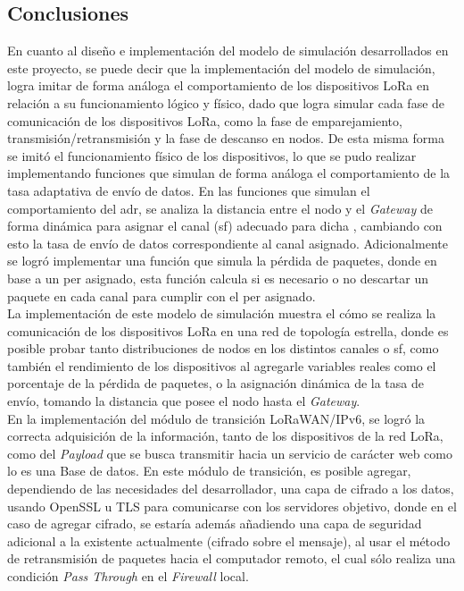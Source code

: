 \begin{justify}
\chapter{Conclusiones}
En cuanto al diseño e implementación del modelo de simulación desarrollados en este proyecto, se puede decir que la implementación del modelo de simulación, logra imitar de forma análoga el comportamiento de los dispositivos LoRa en relación a su funcionamiento lógico y físico, dado que logra simular cada fase de comunicación de los dispositivos LoRa, como la fase de emparejamiento, transmisión/retransmisión y la fase de descanso en nodos. De esta misma forma se imitó el funcionamiento físico de los dispositivos, lo que se pudo realizar implementando funciones que simulan de forma análoga el comportamiento de la tasa adaptativa de envío de datos. En las funciones que simulan el comportamiento del \gls{adr}, se analiza la distancia entre el nodo y el \textit{Gateway} de forma dinámica para asignar el canal (\gls{sf}) adecuado para dicha , cambiando con esto la tasa de envío de datos correspondiente al canal asignado. Adicionalmente se logró implementar una función que simula la pérdida de paquetes, donde en base a un \gls{per} asignado, esta función calcula si es necesario o no descartar un paquete en cada canal para cumplir con el \gls{per} asignado.\\
La implementación de este modelo de simulación muestra el cómo se realiza la comunicación de los dispositivos LoRa en una red de topología estrella, donde es posible probar tanto distribuciones de nodos en los distintos canales o \gls{sf}, como también el rendimiento de los dispositivos al agregarle variables reales como el porcentaje de la pérdida de paquetes, o la asignación dinámica de la tasa de envío, tomando la distancia que posee el nodo hasta el \textit{Gateway}.\\
En la implementación del módulo de transición LoRaWAN/IPv6, se logró la correcta adquisición de la información, tanto de los dispositivos de la red LoRa, como del \textit{Payload} que se busca transmitir hacia un servicio de carácter web como lo es una Base de datos. En este módulo de transición, es posible agregar, dependiendo de las necesidades del desarrollador, una capa de cifrado a los datos, usando OpenSSL u TLS para comunicarse con los servidores objetivo, donde en el caso de agregar cifrado, se estaría además añadiendo una capa de seguridad adicional a la existente actualmente (cifrado sobre el mensaje), al usar el método de retransmisión de paquetes hacia el computador remoto, el cual sólo realiza una condición \textit{Pass Through} en el \textit{Firewall} local.\\

\end{justify}

